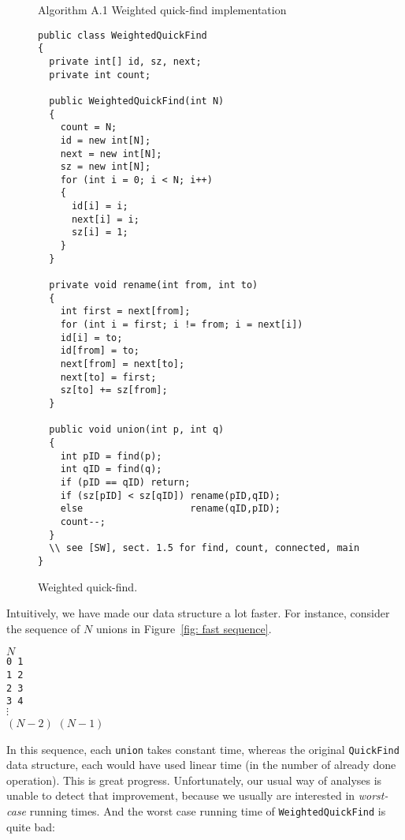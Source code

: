 \documentclass{tufte-handout}
\begin{document}
\begin{figure}

Algorithm A.1 Weighted quick-find implementation

\small
\begin{lstlisting}[basicstyle=\ttfamily,backgroundcolor=\color{white},
  frame=single,rulecolor=\color{gray!20},framesep=10pt, linewidth=12cm]
public class WeightedQuickFind
{
  private int[] id, sz, next;
  private int count;

  public WeightedQuickFind(int N)
  {
    count = N;
    id = new int[N];
    next = new int[N];
    sz = new int[N];
    for (int i = 0; i < N; i++) 
    { 
      id[i] = i;
      next[i] = i;
      sz[i] = 1;
    }
  }

  private void rename(int from, int to)
  {
    int first = next[from];
    for (int i = first; i != from; i = next[i])
	id[i] = to;
    id[from] = to;
    next[from] = next[to];
    next[to] = first;
    sz[to] += sz[from];
  }

  public void union(int p, int q) 
  {
    int pID = find(p); 
    int qID = find(q);
    if (pID == qID) return;
    if (sz[pID] < sz[qID]) rename(pID,qID);
    else                   rename(qID,pID);
    count--;
  }
  \\ see [SW], sect. 1.5 for find, count, connected, main
}
\end{lstlisting}
\caption{\label{fig: WUF impl}Weighted quick-find.}
\end{figure}


Intuitively, we have made our data structure a lot faster.
For instance, consider the sequence of $N$ unions in Figure~\ref{fig: fast sequence}.
\begin{marginfigure}
  \begin{tabbing}
    $N$\\
    {\tt 0 1}\\
    {\tt 1 2}\\
    {\tt 2 3}\\
    {\tt 3 4}\\
  $\vdots$\\
    $(N-2)$ $(N-1)$\\
  \end{tabbing}
\end{marginfigure}
In this sequence, each {\tt union} takes constant time, whereas the original {\tt QuickFind} data structure, each would have used linear time (in the number of already done operation).
This is great progress.
Unfortunately, our usual way of analyses is unable to detect that improvement, because we usually are interested in \emph{worst-case} running times.
And the worst case running time of {\tt WeightedQuickFind} is quite bad:
\end{document}
